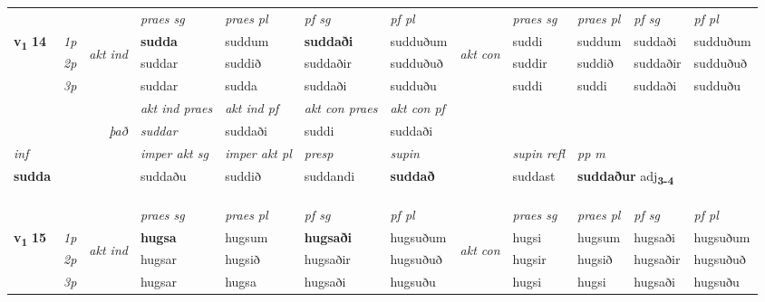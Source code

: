 \begin{longtable}[l]{X>{\footnotesize\itshape}llXXXXlXXXX}
 & &   & \textit{praes sg}  & \textit{praes pl}    & \textit{ pf sg} & \textit{pf pl} & & \textit{praes sg}  & \textit{praes pl}    & \textit{pf sg} & \textit{pf pl }  \\ \cmidrule{4-7} \cmidrule{9-12}
 \multirow{2}{*}{{{\textbf{v{\textsubscript{1}}} \Large{\textbf{14}}}}}  & 1p & \multirow{3}{*}{\begin{turn}{90}\textit{akt ind}\end{turn}} & \textbf{sudda} & suddum & \textbf{suddaði} & sudduðum & \multirow{3}{*}{\begin{turn}{90}\textit{akt con}\end{turn}} &suddi & suddum & suddaði & sudduðum\\*
 & 2p &  &  suddar  & suddið & suddaðir & sudduðuð & & suddir & suddið & suddaðir & sudduðuð \\*
 & 3p &  & suddar & sudda & suddaði & sudduðu & & suddi & suddi& suddaði & sudduðu \\*
\cmidrule{4-7} \cmidrule{9-12}

   && &  \textit{akt ind praes} & \textit{akt ind pf} & \textit{akt con praes} & \textit{akt con pf} \\*
\multicolumn{3}{r}{\textit{það}} & suddar & suddaði & suddi & suddaði \\*

\cmidrule{4-7}
   {\textit{inf}} & &  & \textit{imper akt sg} & \textit{imper akt pl}   & \textit{presp} & \textit{supin} && \textit{supin refl} & \textit{pp m} \\*
  {\textbf{sudda}} & && suddaðu  & suddið   & suddandi &  \textbf{suddað} && suddast & \multicolumn{2}{l}{\textbf{suddaður} adj\textbf{\textsubscript{3-4}}} \\*

\midrule


  & \\*
   & \\*
  & \\
   \midrule
 & &   & \textit{praes sg}  & \textit{praes pl}    & \textit{ pf sg} & \textit{pf pl} & & \textit{praes sg}  & \textit{praes pl}    & \textit{pf sg} & \textit{pf pl }  \\ \cmidrule{4-7} \cmidrule{9-12}
 \multirow{2}{*}{{{\textbf{v{\textsubscript{1}}} \Large{\textbf{15}}}}}  & 1p & \multirow{3}{*}{\begin{turn}{90}\textit{akt ind}\end{turn}} & \textbf{hugsa} & hugsum & \textbf{hugsaði} & hugsuðum & \multirow{3}{*}{\begin{turn}{90}\textit{akt con}\end{turn}} &hugsi & hugsum & hugsaði & hugsuðum\\*
 & 2p &  &  hugsar  & hugsið & hugsaðir & hugsuðuð & & hugsir & hugsið & hugsaðir & hugsuðuð \\*
 & 3p &  & hugsar & hugsa & hugsaði & hugsuðu & & hugsi & hugsi& hugsaði & hugsuðu \\*
\cmidrule{4-7} \cmidrule{9-12}


\end{longtable}
